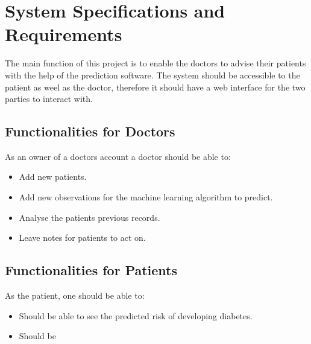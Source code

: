 \documentclass[12pt]{article}
\begin{document}
\newpage
\section{System Specifications and Requirements}
The main function of this project is to enable the doctors to advise their patients with the help of the prediction software. The system should be accessible to the patient as weel as the doctor, therefore it should have a web interface for the two parties to interact with. 
\subsection{Functionalities for Doctors}
As an owner of a doctors account a doctor should be able to:
\begin{itemize}
\item Add new patients.
\item Add new observations for the machine learning algorithm to predict.
\item Analyse the patients previous records.
\item Leave notes for patients to act on.
\end{itemize}
\subsection{Functionalities for Patients}
As the patient, one should be able to:
\begin{itemize}
\item Should be able to see the predicted risk of developing diabetes.
\item Should be 
\end{itemize}



\end{document}
